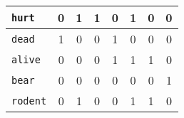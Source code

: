 \begin{table}[H]
\begin{tabular}{|l|c|c|c|c|c|c|c|}
					\texttt{hurt}       & \textcolor{irl}{0}                      & 1                                        & 1                                                 & \textcolor{irl}{0}             & 1                                           & \textcolor{irl}{0}                                & \textcolor{irl}{0}                     \\ \hline
					\texttt{dead}       & 1                                       & \textcolor{irl}{0}                       & \textcolor{irl}{0}                                & 1                              & \textcolor{irl}{0}                          & \textcolor{irl}{0}                                & \textcolor{irl}{0}                     \\ \hline
					\texttt{alive}      & \textcolor{irl}{0}                      & \textcolor{irl}{0}                       & \textcolor{irl}{0}                                & 1                              & 1                                           & 1                                                 & \textcolor{irl}{0}                     \\ \hline
					\texttt{bear}       & \textcolor{irl}{0}                      & \textcolor{irl}{0}                       & \textcolor{irl}{0}                                & \textcolor{irl}{0}             & \textcolor{irl}{0}                          & \textcolor{irl}{0}                                & 1                                      \\ \hline
					\texttt{rodent}     & \textcolor{irl}{0}                      & 1                                        & \textcolor{irl}{0}                                & \textcolor{irl}{0}             & 1                                           & 1                                                 & \textcolor{irl}{0}                     \\ \hline
				\end{tabular}
			\end{table}
